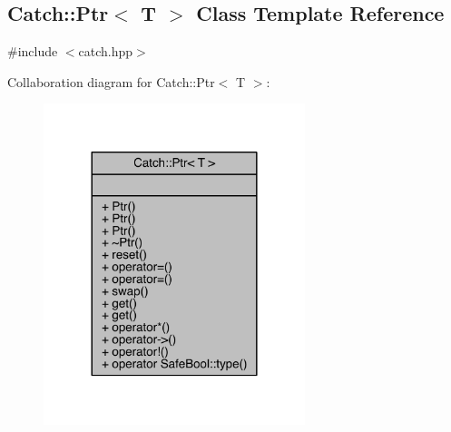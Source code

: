 \hypertarget{a00065}{}\subsection{Catch\+:\+:Ptr$<$ T $>$ Class Template Reference}
\label{a00065}


{\ttfamily \#include $<$catch.\+hpp$>$}



Collaboration diagram for Catch\+:\+:Ptr$<$ T $>$\+:\nopagebreak
\begin{figure}[H]
\begin{center}
\leavevmode
\includegraphics[width=216pt]{a00247}
\end{center}
\end{figure}
